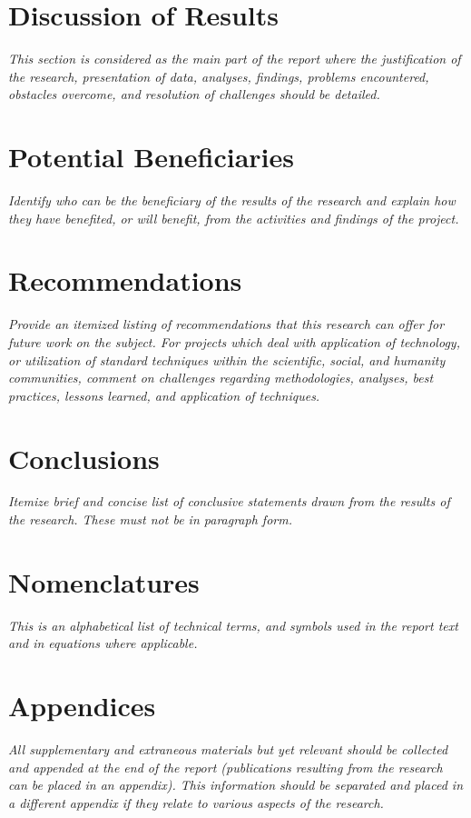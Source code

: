\documentclass[11pt,letterpaper]{article}
\begin{document}
\newpage
\section{Discussion of Results}
\textit{This section is considered as the main part of the report where the justification of the research, presentation of data, analyses, findings, problems encountered, obstacles overcome, and resolution of challenges should be detailed.  }

\newpage
\section{Potential Beneficiaries}
\textit{Identify who can be the beneficiary of the results of the research and explain how they have benefited, or will benefit, from the activities and findings of the project.}

\newpage
\section{Recommendations}
\textit{Provide an itemized listing of recommendations that this research can offer for future work on the subject. For projects which deal with application of technology, or utilization of standard techniques within the scientific, social, and humanity communities,  comment on challenges regarding methodologies, analyses, best practices, lessons learned, and application of techniques.}

\newpage
\section{Conclusions}
\textit{Itemize brief and concise list of conclusive statements drawn from the results of the research. These must not be in paragraph form. }

\newpage
\nocite{Nobody06}



\newpage
\section{Nomenclatures}
\textit{This is an alphabetical list of technical terms, and symbols used in the report text and in equations where applicable.}

\newpage
\section{Appendices}
\textit{All supplementary and extraneous materials but yet relevant should be collected and appended at the end of the report (publications resulting from the research can be placed in an appendix). This information should be separated and placed in a different appendix if they relate to various aspects of the research.}


\newpage
\end{document}
